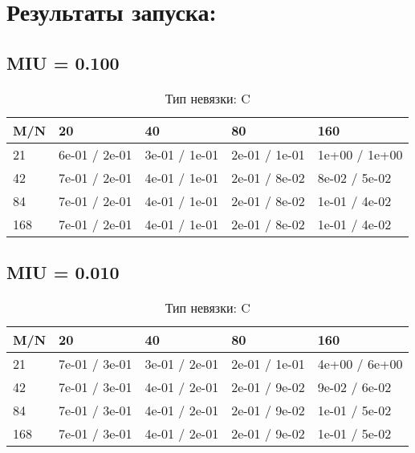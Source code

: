 \documentclass[a4paper,11pt]{article}
\begin{document}
\section{Результаты запуска:}
\subsection{MIU = 0.100}
\begin{table}[H]
\caption {Тип невязки: C   }
\begin{center}
\begin{tabular}{l|l|l|l|l}
\hline
M/N  & 20 & 40 & 80 & 160 \\ \hline
  21 & 6e-01 / 2e-01& 3e-01 / 1e-01& 2e-01 / 1e-01& 1e+00 / 1e+00\\ \hline
  42 & 7e-01 / 2e-01& 4e-01 / 1e-01& 2e-01 / 8e-02& 8e-02 / 5e-02\\ \hline
  84 & 7e-01 / 2e-01& 4e-01 / 1e-01& 2e-01 / 8e-02& 1e-01 / 4e-02\\ \hline
 168 & 7e-01 / 2e-01& 4e-01 / 1e-01& 2e-01 / 8e-02& 1e-01 / 4e-02\\ \hline
\end{tabular}
\end{center}
\end{table}



\subsection{MIU = 0.010}
\begin{table}[H]
\caption {Тип невязки: C   }
\begin{center}
\begin{tabular}{l|l|l|l|l}
\hline
M/N  & 20 & 40 & 80 & 160 \\ \hline
  21 & 7e-01 / 3e-01& 3e-01 / 2e-01& 2e-01 / 1e-01& 4e+00 / 6e+00\\ \hline
  42 & 7e-01 / 3e-01& 4e-01 / 2e-01& 2e-01 / 9e-02& 9e-02 / 6e-02\\ \hline
  84 & 7e-01 / 3e-01& 4e-01 / 2e-01& 2e-01 / 9e-02& 1e-01 / 5e-02\\ \hline
 168 & 7e-01 / 3e-01& 4e-01 / 2e-01& 2e-01 / 9e-02& 1e-01 / 5e-02\\ \hline
\end{tabular}
\end{center}
\end{table}
\end{document}
